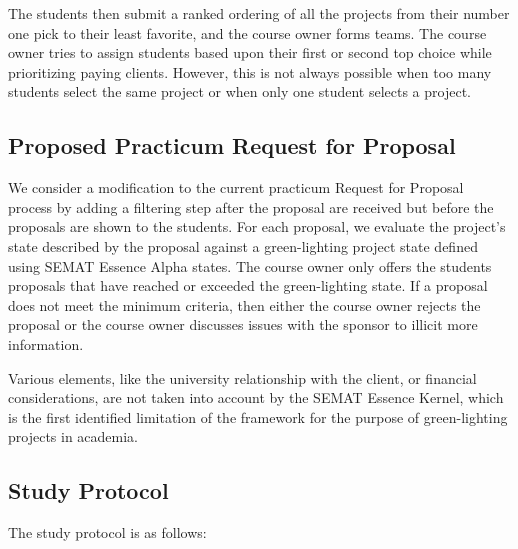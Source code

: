 The students then submit a ranked ordering of all the projects from
their number one pick to their least favorite, and the course owner
forms teams. The course owner tries to assign students based upon their
first or second top choice while prioritizing paying clients. However,
this is not always possible when too many students select the same
project or when only one student selects a project.

\subsection{Proposed Practicum Request for Proposal}

We consider a modification to the current practicum Request for
Proposal process by adding a filtering step after the proposal are
received but before the proposals are shown to the students. For each
proposal, we evaluate the project's state described by the proposal
against a green-lighting project state defined using SEMAT Essence Alpha
states. The course owner only offers the students proposals that have
reached or exceeded the green-lighting state. If a proposal does not
meet the minimum criteria, then either the course owner rejects the
proposal or the course owner discusses issues with the sponsor to
illicit more information.

Various elements, like the university relationship with the client, or financial considerations, are not taken into account by the SEMAT Essence Kernel, which is the first identified limitation of the framework for the purpose of green-lighting projects in academia.

\subsection{Study Protocol}

The study protocol is as follows:


